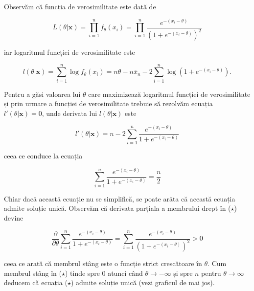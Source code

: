 \documentclass[]{article}
\begin{document}
Observăm că funcția de verosimilitate este dată de

\[
L(\theta|\mathbf{x}) = \prod_{i=1}^{n}f_{\theta}(x_i) = \prod_{i=1}^{n}\frac{e^{-(x_i-\theta)}}{\left(1+e^{-(x_i-\theta)}\right)^2}
\]

iar logaritmul funcției de verosimilitate este

\[
l(\theta|\mathbf{x}) = \sum_{i=1}^{n}\log{f_{\theta}(x_i)} = n\theta - n\bar{x}_n - 2\sum_{i=1}^{n}\log{\left(1+e^{-(x_i-\theta)}\right)}.
\]

Pentru a găsi valoarea lui \(\theta\) care maximizează logaritmul
funcției de verosimilitate și prin urmare a funcției de verosimilitate
trebuie să rezolvăm ecuația \(l'(\theta|\mathbf{x}) = 0\), unde derivata
lui \(l(\theta|\mathbf{x})\) este

\[
l'(\theta|\mathbf{x}) = n - 2\sum_{i = 1}^{n}\frac{e^{-(x_i-\theta)}}{1+e^{-(x_i-\theta)}}
\]

ceea ce conduce la ecuația

\[
  \sum_{i = 1}^{n}\frac{e^{-(x_i-\theta)}}{1+e^{-(x_i-\theta)}} = \frac{n}{2} \tag{$\star$}
\]

Chiar dacă această ecuație nu se simplifică, se poate arăta că această
ecuația admite soluție unică. Observăm că derivata parțiala a membrului
drept în (\(\star\)) devine

\[
\frac{\partial }{\partial \theta}\sum_{i = 1}^{n}\frac{e^{-(x_i-\theta)}}{1+e^{-(x_i-\theta)}} = \sum_{i = 1}^{n}\frac{e^{-(x_i-\theta)}}{\left(1+e^{-(x_i-\theta)}\right)^2}>0
\]

ceea ce arată că membrul stâng este o funcție strict crescătoare în
\(\theta\). Cum membrul stâng în (\(\star\)) tinde spre \(0\) atunci
când \(\theta\to-\infty\) și spre \(n\) pentru \(\theta\to\infty\)
deducem că ecuația (\(\star\)) admite soluție unică (vezi graficul de
mai jos).
\end{document}
